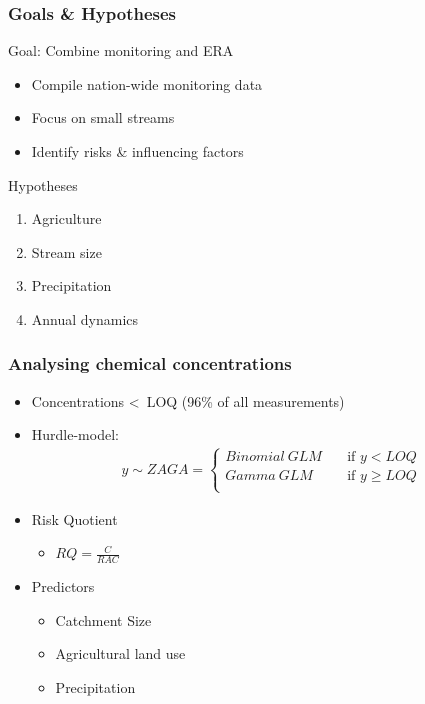 \documentclass[
	10pt
	]{beamer}
\begin{document}
\begin{frame}
\frametitle{Goals \& Hypotheses}
	\begin{exampleblock}{Goal: Combine monitoring and ERA}
		\begin{itemize}
			\item Compile nation-wide monitoring data %
			\item Focus on small streams %
			\item Identify risks \& influencing factors
		\end{itemize}
	\end{exampleblock}
	\pause
	\begin{exampleblock}{Hypotheses}
		\begin{enumerate}
			\item Agriculture
			\item Stream size
			\item Precipitation
			\item Annual dynamics
		\end{enumerate}
	\end{exampleblock}
\end{frame}


\begin{frame}
\frametitle{Analysing chemical concentrations}
	\begin{itemize}
		\pause
		\item Concentrations \textless~LOQ (96\% of all measurements)
		\pause
		\item Hurdle-model: 
			\begin{align*}
			y \sim ZAGA = 
			  \begin{cases}
			    Binomial~GLM   & \quad  \text{if } y < LOQ \\
			    Gamma~GLM & \quad \text{if } y \ge LOQ \\
			  \end{cases}
			\end{align*}
		\pause
		\item Risk Quotient
			\begin{itemize}
				\item \large $RQ = \frac{C}{RAC}$
			\end{itemize}
		\pause
		\item Predictors
		    \begin{itemize}
				\item Catchment Size 
				\item Agricultural land use
				\item Precipitation
			\end{itemize}
	\end{itemize}
\end{frame}
\end{document}
